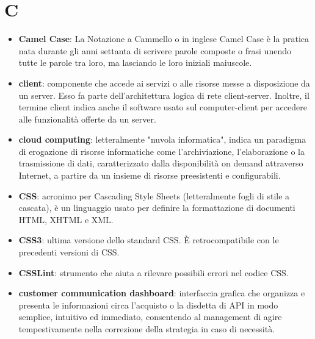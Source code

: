 \section{C}
\begin{itemize}
	\item \textbf{Camel Case}: La Notazione a Cammello o in inglese Camel Case è la pratica nata durante gli anni settanta di scrivere parole composte o frasi unendo tutte le parole tra loro, ma lasciando le loro iniziali maiuscole.
	\item \textbf{client}: componente che accede ai servizi o alle risorse messe a disposizione da un server. Esso fa parte dell'architettura logica di rete client-server. Inoltre, il termine client indica anche il software usato sul computer-client per accedere alle funzionalità offerte da un server.
	\item \textbf{cloud computing}: letteralmente "nuvola informatica", indica un paradigma di erogazione di risorse informatiche come l'archiviazione, l'elaborazione o la trasmissione di dati, caratterizzato dalla disponibilità on demand attraverso Internet, a partire da un insieme di risorse preesistenti e configurabili.
	\item \textbf{CSS}: acronimo per Cascading Style Sheets (letteralmente fogli di stile a cascata), è un linguaggio usato per definire la formattazione di documenti HTML, XHTML e XML.
	\item \textbf{CSS3}: ultima versione dello standard CSS. \MakeUppercase{è} retrocompatibile con le precedenti versioni di CSS.
	\item \textbf{CSSLint}: strumento che aiuta a rilevare possibili errori nel codice CSS.
	\item \textbf{customer communication dashboard}: interfaccia grafica che organizza e presenta le informazioni circa l'acquisto o la disdetta di API in modo semplice, intuitivo ed immediato, consentendo al management di agire tempestivamente nella correzione della strategia in caso di necessità.
\end{itemize}